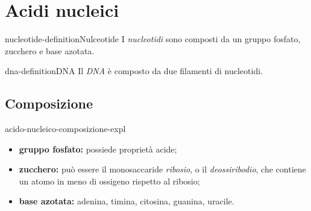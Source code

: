 \documentclass[preview]{standalone}
\begin{document}
\genpage

\section{Acidi nucleici}


\begin{snippetdefinition}{nucleotide-definition}{Nulceotide}
    I \textit{nucleotidi} sono composti da un gruppo fosfato, zucchero e base azotata.
\end{snippetdefinition}

\begin{snippetdefinition}{dna-definition}{DNA}
    Il \textit{DNA} è composto da due filamenti di nucleotidi.
\end{snippetdefinition}

\subsection{Composizione}


\begin{snippet}{acido-nucleico-composizione-expl}
    \begin{itemize}
        \item \textbf{gruppo fosfato:} possiede proprietà acide;
        \item \textbf{zucchero:} può essere il monosaccaride \textit{ribosio}, o il \textit{deossiribodio},
            che contiene un atomo in meno di ossigeno rispetto al ribosio;
        \item \textbf{base azotata:} adenina, timina, citosina, guanina, uracile.
    \end{itemize}
\end{snippet}
\end{document}
